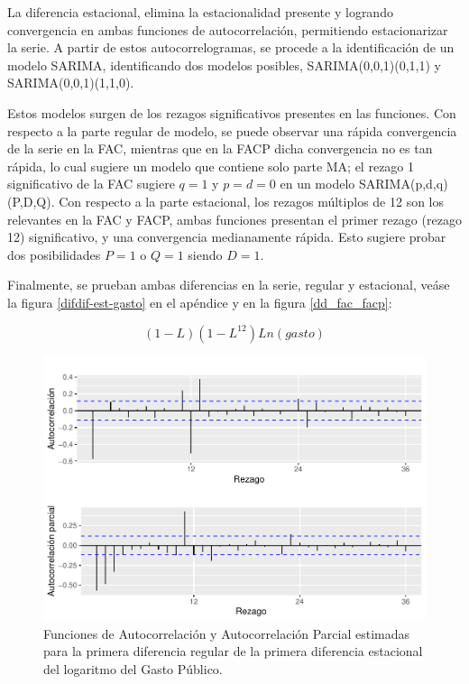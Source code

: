 \documentclass[
  12pt,
]{article}
\begin{document}
La diferencia estacional, elimina la estacionalidad presente y logrando
convergencia en ambas funciones de autocorrelación, permitiendo
estacionarizar la serie. A partir de estos autocorrelogramas, se procede
a la identificación de un modelo SARIMA, identificando dos modelos
posibles, SARIMA(0,0,1)(0,1,1) y SARIMA(0,0,1)(1,1,0).

Estos modelos surgen de los rezagos significativos presentes en las
funciones. Con respecto a la parte regular de modelo, se puede observar
una rápida convergencia de la serie en la FAC, mientras que en la FACP
dicha convergencia no es tan rápida, lo cual sugiere un modelo que
contiene solo parte MA; el rezago 1 significativo de la FAC sugiere
\(q=1\) y \(p=d=0\) en un modelo SARIMA(p,d,q)(P,D,Q). Con respecto a la
parte estacional, los rezagos múltiplos de 12 son los relevantes en la
FAC y FACP, ambas funciones presentan el primer rezago (rezago 12)
significativo, y una convergencia medianamente rápida. Esto sugiere
probar dos posibilidades \(P=1\) o \(Q=1\) siendo \(D=1\).

Finalmente, se prueban ambas diferencias en la serie, regular y
estacional, veáse la figura \ref{difdif-est-gasto} en el apéndice y en
la figura \ref{dd_fac_facp}:

\[(1-L)(1-L^{12}) Ln(gasto)\]

\begin{figure}[H]

{\centering \includegraphics[width=0.75\linewidth]{informe_files/figure-latex/unnamed-chunk-6-1} 

}

\caption{\label{dd_fac_facp} Funciones de Autocorrelación y Autocorrelación Parcial estimadas para la primera diferencia regular de la primera diferencia estacional del logaritmo del Gasto Público.}\label{fig:unnamed-chunk-6}
\end{figure}
\end{document}
